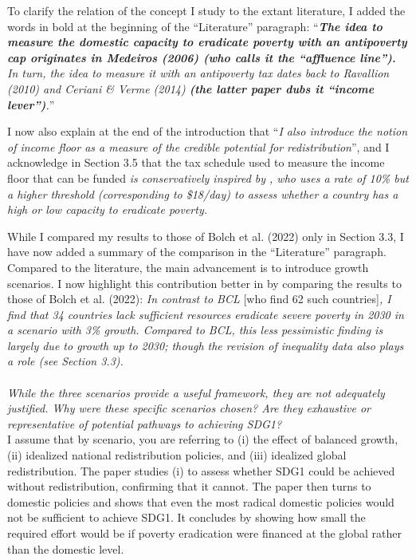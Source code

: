 \documentclass[12pt,english]{article}
\begin{document}
To clarify the relation of the concept I study to the extant literature, I added the words in bold at the beginning of the ``Literature'' paragraph: ``\textit{\textbf{The idea to measure the domestic capacity to eradicate poverty with an antipoverty cap originates in Medeiros (2006) (who calls it the ``affluence line'').} In turn, the idea to measure it with an antipoverty tax dates back to Ravallion (2010) and Ceriani \& Verme (2014) \textbf{(the latter paper dubs it ``income lever'')}.}''

I now also explain at the end of the introduction that ``\textit{I also introduce the notion of \textit{income floor} as a measure of the credible potential for redistribution}'', and I acknowledge in Section 3.5 that the tax schedule used to measure the income floor that can be funded \textit{is conservatively inspired by \cite{ravallion_poorer_2010}, who uses a rate of 10\% but a higher threshold (corresponding to \$18/day) to assess whether a country has a high or low capacity to eradicate poverty.}

While I compared my results to those of Bolch et al. (2022) only in Section 3.3, I have now added a summary of the comparison in the ``Literature'' paragraph. 
Compared to the literature, the main advancement is to introduce growth scenarios. I now highlight this contribution better in by comparing the results to those of Bolch et al. (2022): 
\textit{In contrast to BCL} [who find 62 such countries]\textit{, I find that 34 countries lack sufficient resources eradicate severe poverty in 2030 in a scenario with 3\% growth. Compared to BCL, this less pessimistic finding is largely due to growth up to 2030; though the revision of inequality data also plays a role (see Section 3.3). }
~\\ ~\\

\textit{While the three scenarios provide a useful framework, they are not adequately justified. Why were these specific scenarios chosen? Are they exhaustive or representative of potential pathways to achieving SDG1? }~\\

I assume that by scenario, you are referring to (i) the effect of balanced growth, (ii) idealized national redistribution policies, and (iii) idealized global redistribution. The paper studies (i) to assess whether SDG1 could be achieved without redistribution, confirming that it cannot. The paper then turns to domestic policies and shows that even the most radical domestic policies would not be sufficient to achieve SDG1. It concludes by showing how small the required effort would be if poverty eradication were financed at the global rather than the domestic level. 
\end{document}
